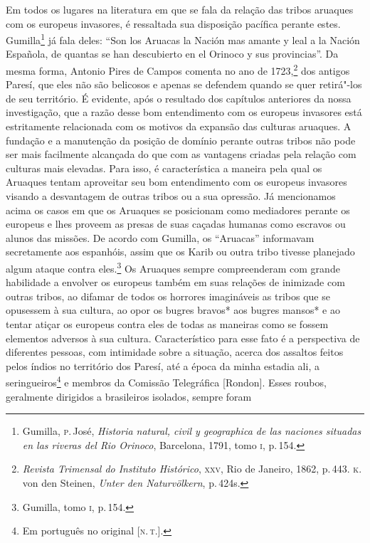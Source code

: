 Em todos os lugares na literatura em que se fala da relação das tribos
aruaques com os europeus invasores, é ressaltada sua disposição pacífica
perante estes. Gumilla\footnote{Gumilla, \textsc{p}.\,José, \textit{Historia
  natural, civil y geographica de las naciones situadas en las riveras
  del Rio Orinoco}, Barcelona, 1791, tomo \textsc{i}, p.\,154.} já fala deles:
``Son los Aruacas la Nación mas amante y leal a la Nación Española, de
quantas se han descubierto en el Orinoco y sus provincias''. Da mesma
forma, Antonio Pires de Campos comenta no ano de 1723,\footnote{\textit{Revista
  Trimensal do Instituto Histórico}, \textsc{xxv}, Rio de Janeiro, 1862, p.\,443.
  \textsc{k}.\,von den Steinen, \textit{Unter den Naturvölkern}, p.\,424s.} dos
antigos Paresí, que eles não são belicosos e apenas se defendem quando
se quer retirá"-los de seu território. É evidente, após o resultado dos
capítulos anteriores da nossa investigação, que a razão desse bom
entendimento com os europeus invasores está estritamente relacionada
com os motivos da expansão das culturas aruaques. A fundação e a
manutenção da posição de domínio perante outras tribos não pode ser mais
facilmente alcançada do que com as vantagens criadas pela relação com
culturas mais elevadas. Para isso, é característica a maneira pela qual
os Aruaques tentam aproveitar seu bom entendimento com os europeus
invasores visando a desvantagem de outras tribos ou a sua opressão. Já
mencionamos acima os casos em que os Aruaques se posicionam como
mediadores perante os europeus e lhes proveem as presas de suas caçadas
humanas como escravos ou alunos das missões. De acordo com Gumilla, os
``Aruacas'' informavam secretamente aos espanhóis, assim que os Karib
ou outra tribo tivesse planejado algum ataque contra eles.\footnote{Gumilla, tomo \textsc{i}, p.\,154.} Os Aruaques sempre
compreenderam com grande habilidade a envolver os europeus também em
suas relações de inimizade com outras tribos, ao difamar de todos os
horrores imagináveis as tribos que se opusessem à sua cultura, ao opor
os bugres bravos* aos bugres mansos* e ao tentar atiçar os europeus
contra eles de todas as maneiras como se fossem elementos adversos à sua
cultura. Característico para esse fato é a perspectiva de diferentes
pessoas, com intimidade sobre a situação, acerca dos assaltos feitos
pelos índios no território dos Paresí, até a época da minha estadia
ali, a seringueiros\footnote{Em português no original {[}\textsc{n.\,t.}{]}.} e membros da Comissão Telegráfica {[}Rondon{]}.
Esses roubos, geralmente dirigidos a brasileiros isolados, sempre foram
